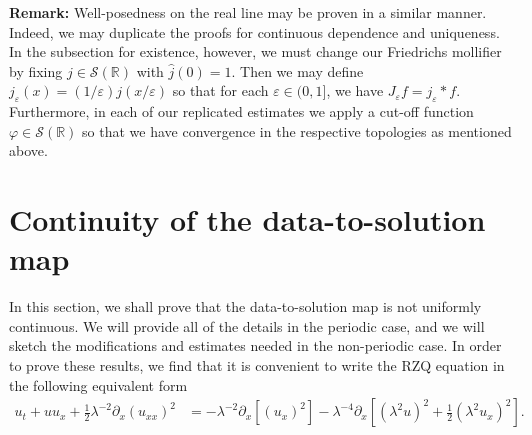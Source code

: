 \documentclass[reqno]{amsart}
\theoremstyle{plain}
\numberwithin{equation}{section}
\newcommand{\rr}{\mathbb{R}}
\newcommand{\wh}{\widehat}
\newcommand{\ee}{\varepsilon}
\newcommand{\vp}{\varphi}
\begin{document}
\textbf{Remark:}  Well-posedness on the real line may be proven in a similar manner.  Indeed, we may duplicate the proofs for continuous dependence and uniqueness.  In the subsection for existence, however, we must change our Friedrichs mollifier by fixing $j \in \mathcal{S}(\rr)$ with $\wh{j}(0) = 1$.  Then we may define $j_\ee(x) = (1/\ee)j(x/\ee)$ so that for each $\ee \in (0,1]$, we have $J_\ee f = j_\ee * f$.  Furthermore, in each of our replicated estimates we apply a cut-off function $\vp \in \mathcal{S}(\rr)$ so that we have convergence in the respective topologies as mentioned above.



 
  \section{Continuity of the data-to-solution map}
In this section, we shall prove that the data-to-solution map is not uniformly continuous. We will provide all of the details in the periodic case, and we will sketch the modifications and estimates needed in the non-periodic case. In order to prove these results, we find that it is convenient to write the RZQ equation in the following equivalent form
\begin{align}
      u_t  + uu_x + \frac12 \lambda^{-2} \partial_x (u_{xx})^2 
  & =  - \lambda^{-2}  \partial_x \left [(u_x)^2   \right ]  
  - \lambda^{-4} \partial_x \left [  ( \lambda^2   u)^2 +\frac12 (\lambda^2 u_x)^2 
   \right ]  .
\end{align}
\end{document}
